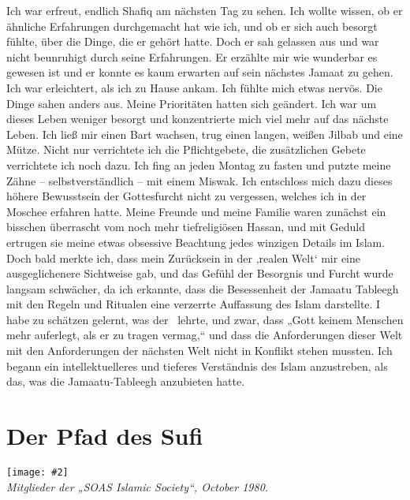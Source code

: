 \documentclass[12pt]{memoir}
\newcommand{\img}[3]{\begin{center}%
\texttt{[image: \#2]}\\{\small\em#3}%
\end{center}}
\begin{document}
Ich war erfreut, endlich Shafiq am nächsten Tag zu sehen.
Ich wollte wissen, ob er ähnliche Erfahrungen durchgemacht hat wie ich,
und ob er sich auch besorgt fühlte, über die Dinge, die er gehört hatte.
Doch er sah gelassen aus und war nicht beunruhigt durch seine Erfahrungen.
Er erzählte mir wie wunderbar es gewesen ist
und er konnte es kaum erwarten auf sein nächstes Jamaat zu gehen.
Ich war erleichtert, als ich zu Hause ankam.
Ich fühlte mich etwas nervös.
Die Dinge sahen anders aus.
Meine Prioritäten hatten sich geändert.
Ich war um dieses Leben weniger besorgt
und konzentrierte mich viel mehr auf das nächste Leben.
Ich ließ mir einen Bart wachsen, trug einen langen,
weißen Jilbab und eine Mütze.
Nicht nur verrichtete ich die Pflichtgebete,
die zusätzlichen Gebete verrichtete ich noch dazu.
Ich fing an jeden Montag zu fasten und putzte meine Zähne
– selbstverständlich – mit einem Miswak.
Ich entschloss mich dazu dieses höhere Bewusstsein der Gottesfurcht
nicht zu vergessen, welches ich in der Moschee erfahren hatte.
Meine Freunde und meine Familie waren zunächst ein bisschen überrascht
vom noch mehr tiefreligiösen Hassan,
und mit Geduld ertrugen sie meine etwas obsessive Beachtung
jedes winzigen Details im Islam.
Doch bald merkte ich, dass mein Zurücksein in der ‚realen Welt‘
mir eine ausgeglichenere Sichtweise gab,
und das Gefühl der Besorgnis und Furcht wurde langsam schwächer,
da ich erkannte, dass die Besessenheit der Jamaatu Tableegh mit den Regeln
und Ritualen eine verzerrte Auffassung des Islam darstellte.
I habe zu schätzen gelernt, was der \Quran\ lehrte, und zwar,
dass „Gott keinem Menschen mehr auferlegt, als er zu tragen vermag,“
und dass die Anforderungen dieser Welt mit den Anforderungen
der nächsten Welt nicht in Konflikt stehen mussten.
Ich begann ein intellektuelleres und tieferes Verständnis
des Islam anzustreben, als das, was die Jamaatu-Tableegh anzubieten hatte.


\chapter{Der Pfad des Sufi}

\img{scale=0.7}{Members_SOAS_Islamic_Society.jpg}
{Mitglieder der „SOAS Islamic Society“, October 1980.}
\end{document}
